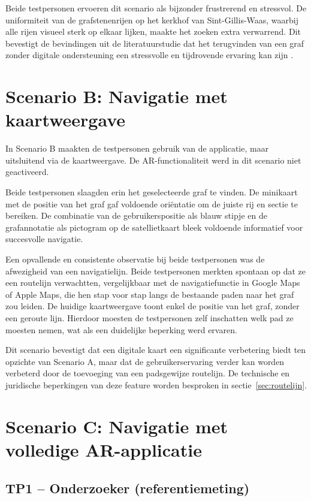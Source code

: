 Beide testpersonen ervoeren dit scenario als bijzonder frustrerend en stressvol.
De uniformiteit van de grafstenenrijen op het kerkhof van Sint-Gillis-Waas, waarbij
alle rijen visueel sterk op elkaar lijken, maakte het zoeken extra verwarrend.
Dit bevestigt de bevindingen uit de literatuurstudie dat het terugvinden van een
graf zonder digitale ondersteuning een stressvolle en tijdrovende ervaring kan
zijn \autocite{Haekkilae2022}.

\section{Scenario B: Navigatie met kaartweergave}

In Scenario B maakten de testpersonen gebruik van de applicatie, maar uitsluitend
via de kaartweergave. De AR-functionaliteit werd in dit scenario niet geactiveerd.

Beide testpersonen slaagden erin het geselecteerde graf te vinden. De minikaart
met de positie van het graf gaf voldoende oriëntatie om de juiste rij en sectie
te bereiken. De combinatie van de gebruikerspositie als blauw stipje en de
grafannotatie als pictogram op de satellietkaart bleek voldoende informatief
voor succesvolle navigatie.

Een opvallende en consistente observatie bij beide testpersonen was de afwezigheid
van een navigatielijn. Beide testpersonen merkten spontaan op dat ze een
routelijn verwachtten, vergelijkbaar met de navigatiefunctie in Google Maps of
Apple Maps, die hen stap voor stap langs de bestaande paden naar het graf zou
leiden. De huidige kaartweergave toont enkel de positie van het graf, zonder
een geroute lijn. Hierdoor moesten de testpersonen zelf inschatten welk pad
ze moesten nemen, wat als een duidelijke beperking werd ervaren.

Dit scenario bevestigt dat een digitale kaart een significante verbetering biedt
ten opzichte van Scenario A, maar dat de gebruikerservaring verder kan worden
verbeterd door de toevoeging van een padsgewijze routelijn. De technische en
juridische beperkingen van deze feature worden besproken in
sectie~\ref{sec:routelijn}.

\section{Scenario C: Navigatie met volledige AR-applicatie}

\subsection{TP1 -- Onderzoeker (referentiemeting)}

